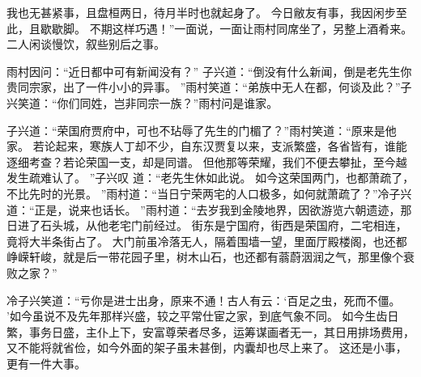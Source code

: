我也无甚紧事，且盘桓两日，待月半时也就起身了。
今日敝友有事，我因闲步至此，且歇歇脚。
不期这样巧遇！”一面说，一面让雨村同席坐了，另整上酒肴来。
二人闲谈慢饮，叙些别后之事。
\par
雨村因问：“近日都中可有新闻没有？”
子兴道：“倒没有什么新闻，倒是老先生你贵同宗家，出了一件小小的异事。
”雨村笑道：“弟族中无人在都，何谈及此？”子兴笑道：“你们同姓，岂非同宗一族？”雨村问是谁家。
\par
子兴道：“荣国府贾府中，可也不玷辱了先生的门楣了？”雨村笑道：“原来是他家。
若论起来，寒族人丁却不少，自东汉贾复以来，支派繁盛，各省皆有，谁能逐细考查？若论荣国一支，却是同谱。
但他那等荣耀，我们不便去攀扯，至今越发生疏难认了。
”子兴叹
道：“老先生休如此说。
如今这荣国两门，也都萧疏了，不比先时的光景。
”雨村道：“当日宁荣两宅的人口极多，如何就萧疏了？”冷子兴道：“正是，说来也话长。
”雨村道：“去岁我到金陵地界，因欲游览六朝遗迹，那日进了石头城，从他老宅门前经过。
街东是宁国府，街西是荣国府，二宅相连，竟将大半条街占了。
大门前虽冷落无人，隔着围墙一望，里面厅殿楼阁，也还都峥嵘轩峻，就是后一带花园子里，树木山石，也还都有蓊蔚洇润之气，那里像个衰败之家？”\par
冷子兴笑道：“亏你是进士出身，原来不通！古人有云：‘百足之虫，死而不僵。
’如今虽说不及先年那样兴盛，较之平常仕宦之家，到底气象不同。
如今生齿日繁，事务日盛，主仆上下，安富尊荣者尽多，运筹谋画者无一，其日用排场费用，又不能将就省俭，如今外面的架子虽未甚倒，内囊却也尽上来了。
这还是小事，更有一件大事。
